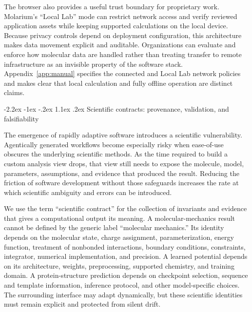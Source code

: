 \documentclass[11pt]{article}
\makeatletter
\renewcommand\section{\@startsection{section}{1}{\z@}%
  {-2.2ex \@plus -1ex \@minus -.2ex}%
  {1.1ex \@plus .2ex}%
  {\normalfont\Large\bfseries\color{molblue}}}
\makeatother
\begin{document}
The browser also provides a useful trust boundary for proprietary work. Molarium's ``Local Lab'' mode can restrict network access and verify reviewed application assets while keeping supported calculations on the local device. Because privacy controls depend on deployment configuration, this architecture makes data movement explicit and auditable. Organizations can evaluate and enforce how molecular data are handled rather than treating transfer to remote infrastructure as an invisible property of the software stack. Appendix~\ref{app:manual} specifies the connected and Local Lab network policies and makes clear that local calculation and fully offline operation are distinct claims.

\section{Scientific contracts: provenance, validation, and falsifiability}

The emergence of rapidly adaptive software introduces a scientific vulnerability. Agentically generated workflows become especially risky when ease-of-use obscures the underlying scientific methods. As the time required to build a custom analysis view drops, that view still needs to expose the molecule, model, parameters, assumptions, and evidence that produced the result. Reducing the friction of software development without those safeguards increases the rate at which scientific ambiguity and errors can be introduced.

We use the term ``scientific contract'' for the collection of invariants and evidence that gives a computational output its meaning. A molecular-mechanics result cannot be defined by the generic label ``molecular mechanics.'' Its identity depends on the molecular state, charge assignment, parameterization, energy function, treatment of nonbonded interactions, boundary conditions, constraints, integrator, numerical implementation, and precision. A learned potential depends on its architecture, weights, preprocessing, supported chemistry, and training domain. A protein-structure prediction depends on checkpoint selection, sequence and template information, inference protocol, and other model-specific choices. The surrounding interface may adapt dynamically, but these scientific identities must remain explicit and protected from silent drift.
\end{document}
